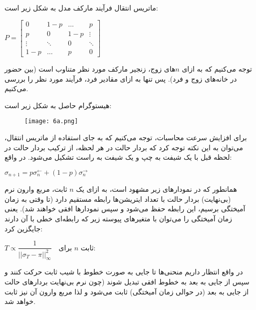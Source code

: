 \documentclass{scribe-cgenomics}
\begin{document}
\newpage
\section{}
ماتریس انتقال فرآیند مارکف مدل به شکل زیر است:

\begin{center}
$
P = \begin{bmatrix}
0 & 1-p & \dots & p\\
p & 0 & 1-p & \vdots \\
\vdots & \ddots & 0 & \ddots \\
1-p & \dots & p & 0
\end{bmatrix}
$
\end{center}

توجه می‌کنیم که به ازای
$n$های
زوج، زنجیر مارکف مورد نظر متناوب است (بین حضور در خانه‌های زوج و فرد). پس تنها به ازای مقادیر فرد، فرآیند مورد نظر را بررسی می‌کنیم.

هیستوگرام حاصل به شکل زیر است:

\begin{figure}[h]\label{6a}
\texttt{[image: 6a.png]}
\centering
\end{figure}

برای افزایش سرعت محاسبات، توجه می‌کنیم که به جای استفاده از ماتریس انتقال، می‌توان به این نکته توجه کرد که بردار حالت در هر لحظه، از ترکیب بردار حالت در لحظه قبل با یک شیفت به چپ و یک شیفت به راست تشکیل می‌شود. در واقع:

\begin{center}
$
\sigma_{n+1} = p \sigma_n ^{\leftarrow} + (1-p) \sigma_n ^{\rightarrow}
$
\end{center}

همانطور که در نمودار‌های زیر مشهود است، به ازای یک 
$n$
ثابت، مربع وارون نرم (بی‌نهایت) بردار حالت با تعداد ایتریشن‌ها رابطه مستقیم دارد (تا وقتی به زمان آمیختگی برسیم، این رابطه حفظ می‌شود و سپس نمودارها افقی خواهند شد). یعنی زمان آمیختگی را می‌توان با متغیرهای پیوسته زیر که رابطه‌ای خطی با آن دارند جایگزین کرد:


\begin{center}
$
T \propto \dfrac{1}{|| \sigma_T - \pi||_{\infty}^2}
\quad \text{برای $n$ ثابت:}
$
\end{center}


در واقع انتظار داریم منحنی‌ها تا جایی به صورت خطوط با شیب ثابت حرکت کنند و سپس از جایی به بعد به خطوط افقی تبدیل شوند (چون نرم بی‌نهایت بردارهای حالت از جایی به بعد (در حوالی زمان آمیختگی) ثابت می‌شود و لذا مربع وارون آن نیز ثابت خواهد شد.

\bigbreak
\end{document}

